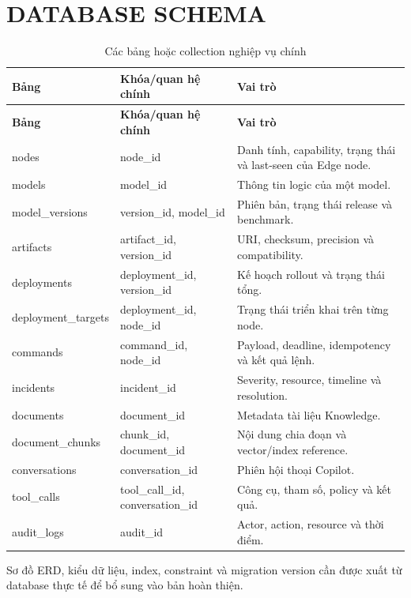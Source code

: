 \chapter{DATABASE SCHEMA}

\begin{longtable}{L{3.8cm}L{4cm}L{6.7cm}}
\caption{Các bảng hoặc collection nghiệp vụ chính}\label{tab:database-schema}\\
\toprule
\textbf{Bảng} & \textbf{Khóa/quan hệ chính} & \textbf{Vai trò}\\
\midrule\endfirsthead
\toprule
\textbf{Bảng} & \textbf{Khóa/quan hệ chính} & \textbf{Vai trò}\\
\midrule\endhead
nodes & node\_id & Danh tính, capability, trạng thái và last-seen của Edge node.\\
models & model\_id & Thông tin logic của một model.\\
model\_versions & version\_id, model\_id & Phiên bản, trạng thái release và benchmark.\\
artifacts & artifact\_id, version\_id & URI, checksum, precision và compatibility.\\
deployments & deployment\_id, version\_id & Kế hoạch rollout và trạng thái tổng.\\
deployment\_targets & deployment\_id, node\_id & Trạng thái triển khai trên từng node.\\
commands & command\_id, node\_id & Payload, deadline, idempotency và kết quả lệnh.\\
incidents & incident\_id & Severity, resource, timeline và resolution.\\
documents & document\_id & Metadata tài liệu Knowledge.\\
document\_chunks & chunk\_id, document\_id & Nội dung chia đoạn và vector/index reference.\\
conversations & conversation\_id & Phiên hội thoại Copilot.\\
tool\_calls & tool\_call\_id, conversation\_id & Công cụ, tham số, policy và kết quả.\\
audit\_logs & audit\_id & Actor, action, resource và thời điểm.\\
\bottomrule
\end{longtable}

Sơ đồ ERD, kiểu dữ liệu, index, constraint và migration version cần được xuất từ
database thực tế để bổ sung vào bản hoàn thiện.